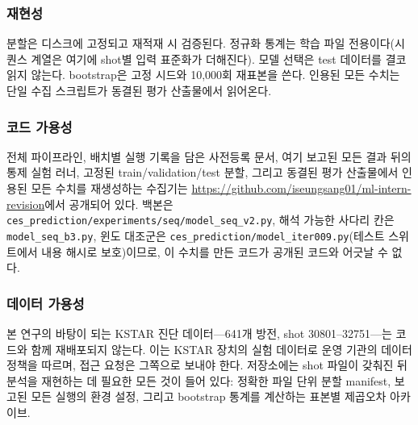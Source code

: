\documentclass[10pt,a4paper]{article}
\begin{document}
\subsubsection*{재현성}
분할은 디스크에 고정되고 재적재 시 검증된다. 정규화 통계는 학습 파일
전용이다(시퀀스 계열은 여기에 shot별 입력 표준화가 더해진다). 모델 선택은 test
데이터를 결코 읽지 않는다. bootstrap은 고정 시드와 10{,}000회 재표본을 쓴다.
인용된 모든 수치는 단일 수집 스크립트가 동결된 평가 산출물에서 읽어온다.

\subsubsection*{코드 가용성}
전체 파이프라인, 배치별 실행 기록을 담은 사전등록 문서, 여기 보고된 모든 결과
뒤의 통제 실험 러너, 고정된 train/validation/test 분할, 그리고 동결된 평가
산출물에서 인용된 모든 수치를 재생성하는 수집기는
\url{https://github.com/iseungsang01/ml-intern-revision}에서 공개되어 있다.
백본은 \texttt{ces\_prediction/experiments/seq/model\_seq\_v2.py}, 해석 가능한
사다리 칸은 \texttt{model\_seq\_b3.py}, 윈도 대조군은
\texttt{ces\_prediction/model\_iter009.py}(테스트 스위트에서 내용 해시로 보호)이므로,
이 수치를 만든 코드가 공개된 코드와 어긋날 수 없다.

\subsubsection*{데이터 가용성}
본 연구의 바탕이 되는 KSTAR 진단 데이터---641개 방전, shot 30801--32751---는
코드와 함께 재배포되지 않는다. 이는 KSTAR 장치의 실험 데이터로 운영 기관의 데이터
정책을 따르며, 접근 요청은 그쪽으로 보내야 한다. 저장소에는 shot 파일이 갖춰진
뒤 분석을 재현하는 데 필요한 모든 것이 들어 있다: 정확한 파일 단위 분할 manifest,
보고된 모든 실행의 환경 설정, 그리고 bootstrap 통계를 계산하는 표본별 제곱오차
아카이브.



\end{document}
